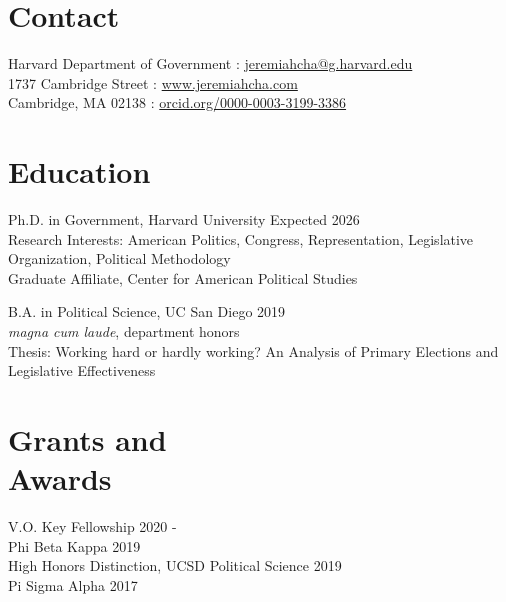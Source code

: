 \documentclass[margin, line]{res}
\begin{document}
\begin{resume}

\section{Contact}
Harvard Department of Government \hfill \Letter: \href{mailto:jeremiahcha@g.harvard.edu}{jeremiahcha@g.harvard.edu}\\
1737 Cambridge Street \hfill \Mundus: \href{httsp://www.jeremiahcha.com}{www.jeremiahcha.com}\\
Cambridge, MA 02138 \hfill \Mundus: \href{https://orcid.org/0000-0003-3199-3386}{orcid.org/0000-0003-3199-3386}

\section{Education}
Ph.D. in Government, Harvard University \hfill Expected 2026\\
\hspace*{5mm}Research Interests: American Politics, Congress, Representation, Legislative\\
\hspace*{35mm}Organization, Political Methodology\\
\hspace*{5mm}Graduate Affiliate, Center for American Political Studies

B.A. in Political Science, UC San Diego \hfill 2019\\
\hspace*{5mm}\textit{magna cum laude}, department honors\\
\hspace*{5mm}Thesis: Working hard or hardly working? An Analysis of Primary Elections and\\ 
\hspace*{18mm}Legislative Effectiveness

\section{Grants and \\Awards}
V.O. Key Fellowship \hfill 2020 - \\
Phi Beta Kappa \hfill 2019\\
High Honors Distinction, UCSD Political Science \hfill 2019\\
Pi Sigma Alpha \hfill 2017



\end{resume}
\end{document}
